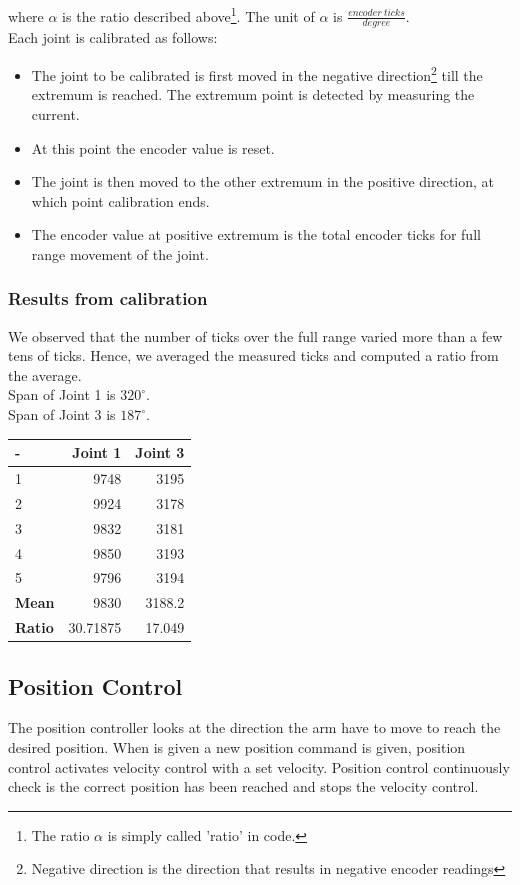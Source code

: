 \documentclass[10pt,a4paper]{article}
\begin{document}
where \(\alpha\) is the ratio described above\footnote{The ratio
  \(\alpha\) is simply called 'ratio' in code.}. The unit of
\(\alpha\) is \( \frac{encoder\ ticks}{degree}\). \\


Each joint is calibrated as follows:
\begin{itemize}
\item The joint to be calibrated is first moved in the negative
  direction\footnote{Negative direction is the direction that results
    in negative encoder readings} till the extremum is reached. The
  extremum point is detected by measuring the current.
\item At this point the encoder value is reset. 
\item The joint is then moved to the other extremum in the positive
  direction, at which point calibration ends.
\item The encoder value at positive extremum is the total encoder
  ticks for full range movement of the joint.
\end{itemize}

\subsubsection{Results from calibration}

We observed that the number of ticks over the full range varied more
than a few tens of ticks. Hence, we averaged the measured ticks and
computed a ratio from the average. \\ 
Span of Joint 1 is \(320^{\circ}\).\\
Span of Joint 3 is \(187^{\circ}\).\\

\begin{tabular}{ | l | r | r |}
\hline
- & \textbf{Joint 1} & \textbf{Joint 3} \\
\hline
1 & 9748 & 3195 \\
\hline
2 & 9924 & 3178 \\
\hline
3 & 9832 & 3181 \\
\hline
4 & 9850 & 3193 \\
\hline
5 & 9796 & 3194 \\
\hline
\textbf{Mean} & 9830 & 3188.2 \\
\hline
\textbf{Ratio} & 30.71875 & 17.049 \\
\hline

\end{tabular}

\subsection{Position Control}
The position controller looks at the direction the arm have to move to reach the desired position. When is given a new position command is given, position control activates velocity control with a set velocity. Position control continuously check is the correct position has been reached and stops the velocity control.
\end{document}
